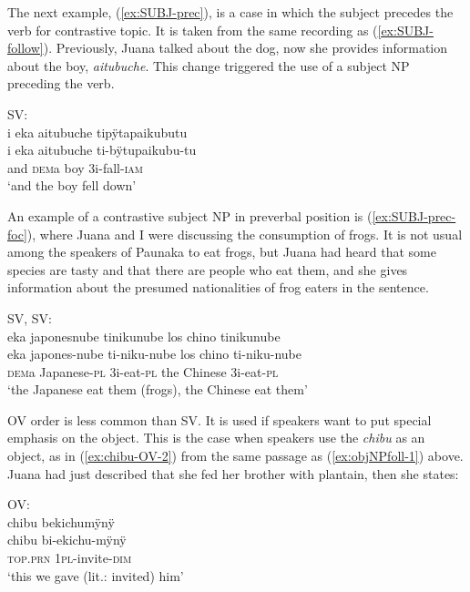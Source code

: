 The next example, (\ref{ex:SUBJ-prec}), is a case in which the subject precedes the verb for contrastive topic. It is taken from the same recording as (\ref{ex:SUBJ-follow}). Previously, Juana talked about the dog, now she provides information about the boy, \textit{aitubuche}. This change triggered the use of a subject NP preceding the verb.

\ea\label{ex:SUBJ-prec}
\begingl 
\glpreamble  \textup{SV:}\\i eka aitubuche tipÿtapaikubutu\\
\gla i eka aitubuche ti-bÿtupaikubu-tu\\ 
\glb and \textsc{dem}a boy 3i-fall-\textsc{iam}\\ 
\glft ‘and the boy fell down’\\ 
\endgl
\trailingcitation{[jxx-a120516l-a.148]}
\xe
{}

An example of a contrastive  subject NP in preverbal position is (\ref{ex:SUBJ-prec-foc}), where Juana and I were discussing the consumption of frogs. It is not usual among the speakers of Paunaka to eat frogs, but Juana had heard that some species are tasty and that there are people who eat them, and she gives information about the presumed nationalities of frog eaters in the sentence.


\ea\label{ex:SUBJ-prec-foc}
\begingl 
\glpreamble  \textup{SV, SV:}\\eka japonesnube tinikunube los chino tinikunube\\
\gla eka japones-nube ti-niku-nube {los chino} ti-niku-nube\\ 
\glb \textsc{dem}a Japanese-\textsc{pl} 3i-eat-\textsc{pl} {the Chinese} 3i-eat-\textsc{pl}\\ 
\glft ‘the Japanese eat them (frogs), the Chinese eat them’\\ 
\endgl
\trailingcitation{[jxx-a120516l-a.482]}
\xe



OV order is less common than SV. It is used if speakers want to put special emphasis on the object. This is the case when speakers use the  \textit{chibu} as an object, as in (\ref{ex:chibu-OV-2}) from the same passage as (\ref{ex:objNPfoll-1}) above. Juana had just described that she fed her brother with plantain, then she states:

\ea\label{ex:chibu-OV-2}
\begingl
\glpreamble  \textup{OV:}\\chibu bekichumÿnÿ\\
\gla chibu bi-ekichu-mÿnÿ\\
\textsc{top.prn} 1\textsc{pl}-invite-\textsc{dim}\\
\glft ‘this we gave (lit.: invited) him’
\endgl
\trailingcitation{[jxx-p120430l-2.482]}
\xe

